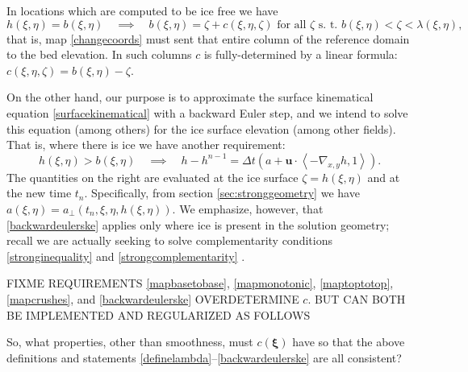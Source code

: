 \documentclass[letterpaper,final,12pt,reqno]{amsart}
\newcommand{\grad}{\nabla}
\newcommand{\bu}{\mathbf{u}}
\newcommand{\bxi}{\bm{\xi}}
\begin{document}
In locations which are computed to be ice free we have
\begin{equation}
h(\xi,\eta)=b(\xi,\eta) \quad \implies \quad b(\xi,\eta) = \zeta + c(\xi,\eta,\zeta) \text{ for all } \zeta \text{ s.~t. } b(\xi,\eta) < \zeta < \lambda(\xi,\eta), \label{mapcrushes}
\end{equation}
that is, map \eqref{changecoords} must sent that entire column of the reference domain to the bed elevation.  In such columns $c$ is fully-determined by a linear formula: $c(\xi,\eta,\zeta) = b(\xi,\eta) - \zeta$.

On the other hand, our purpose is to approximate the surface kinematical equation \eqref{surfacekinematical} with a backward Euler step, and we intend to solve this equation (among others) for the ice surface elevation (among other fields).  That is, where there is ice we have another requirement:
\begin{equation}
h(\xi,\eta)>b(\xi,\eta) \quad \implies \quad h - h^{n-1} = \Delta t\left(a + \bu \cdot \left<-\grad_{x,y} h,1\right>\right). \label{backwardeulerske}
\end{equation}
The quantities on the right are evaluated at the ice surface $\zeta=h(\xi,\eta)$ and at the new time $t_n$.  Specifically, from section \ref{sec:stronggeometry} we have $a(\xi,\eta)=a_{\perp}(t_n,\xi,\eta,h(\xi,\eta))$.  We emphasize, however, that \eqref{backwardeulerske} applies only where ice is present in the solution geometry; recall we are actually seeking to solve complementarity conditions \eqref{stronginequality} and \eqref{strongcomplementarity} \cite{Bueler2020}.

FIXME REQUIREMENTS \eqref{mapbasetobase}, \eqref{mapmonotonic}, \eqref{maptoptotop}, \eqref{mapcrushes}, and \eqref{backwardeulerske} OVERDETERMINE $c$. BUT CAN BOTH BE IMPLEMENTED AND REGULARIZED AS FOLLOWS

So, what properties, other than smoothness, must $c(\bxi)$ have so that the above definitions and statements \eqref{definelambda}--\eqref{backwardeulerske} are all consistent?
\end{document}
